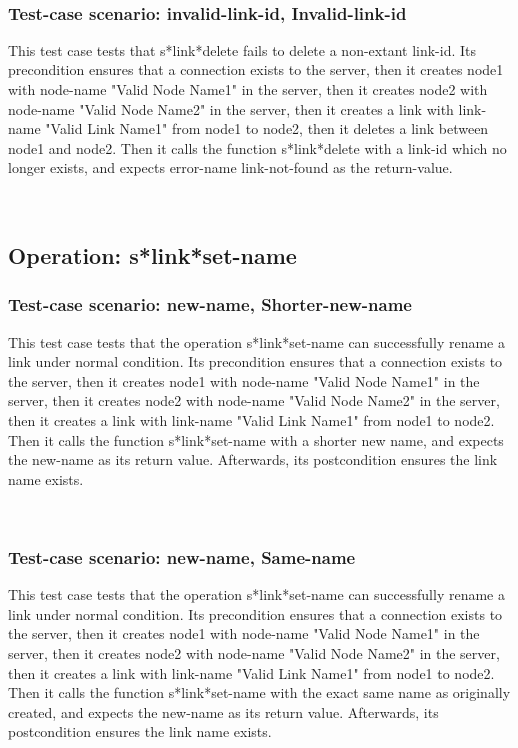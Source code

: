 \
\subsubsection {Test-case scenario: invalid-link-id, Invalid-link-id}


This test case tests that s*link*delete fails to delete a non-extant link-id.
Its precondition ensures that a connection exists to the server, then it creates node1 with node-name "Valid Node Name1" in the server, then it creates node2 with node-name  "Valid Node Name2" in the server, then it creates a link with link-name "Valid Link Name1" from node1 to node2, then it deletes a link between node1 and node2.
Then it calls the function s*link*delete  with a link-id which no longer exists, and expects error-name link-not-found as the return-value.





\
\subsection {Operation: s*link*set-name}
\subsubsection {Test-case scenario: new-name, Shorter-new-name}


This test case tests that the operation s*link*set-name can successfully rename a link under normal condition.
Its precondition ensures that a connection exists to the server, then it creates node1 with node-name "Valid Node Name1" in the server, then it creates node2 with node-name  "Valid Node Name2" in the server, then it creates a link with link-name "Valid Link Name1" from node1 to node2.
Then it calls the function s*link*set-name  with a shorter new name, and expects the new-name as its return value.
Afterwards, its postcondition ensures the link name exists.




\
\subsubsection {Test-case scenario: new-name, Same-name}


This test case tests that the operation s*link*set-name can successfully rename a link under normal condition.
Its precondition ensures that a connection exists to the server, then it creates node1 with node-name "Valid Node Name1" in the server, then it creates node2 with node-name  "Valid Node Name2" in the server, then it creates a link with link-name "Valid Link Name1" from node1 to node2.
Then it calls the function s*link*set-name  with the exact same name as originally created, and expects the new-name as its return value.
Afterwards, its postcondition ensures the link name exists.




